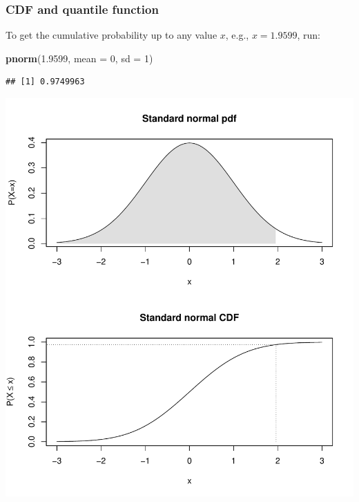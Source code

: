 \documentclass[
  11pt,
]{article}
\newenvironment{Shaded}{\begin{snugshade}}{\end{snugshade}}
\newcommand{\AttributeTok}[1]{\textcolor[rgb]{0.13,0.29,0.53}{#1}}
\newcommand{\DecValTok}[1]{\textcolor[rgb]{0.00,0.00,0.81}{#1}}
\newcommand{\FloatTok}[1]{\textcolor[rgb]{0.00,0.00,0.81}{#1}}
\newcommand{\FunctionTok}[1]{\textcolor[rgb]{0.13,0.29,0.53}{\textbf{#1}}}
\newcommand{\NormalTok}[1]{#1}
\begin{document}
\hypertarget{cdf-and-quantile-function}{%
\subsubsection{CDF and quantile function}\label{cdf-and-quantile-function}}

To get the cumulative probability up to any value \(x\), e.g., \(x = 1.9599\), run:

\begin{Shaded}
\begin{Highlighting}[]
\FunctionTok{pnorm}\NormalTok{(}\FloatTok{1.9599}\NormalTok{, }\AttributeTok{mean =} \DecValTok{0}\NormalTok{, }\AttributeTok{sd =} \DecValTok{1}\NormalTok{)}
\end{Highlighting}
\end{Shaded}

\begin{verbatim}
## [1] 0.9749963
\end{verbatim}

\begin{center}\includegraphics{01-01-lec_files/figure-latex/stdnorm-5-1} \end{center}
\end{document}
